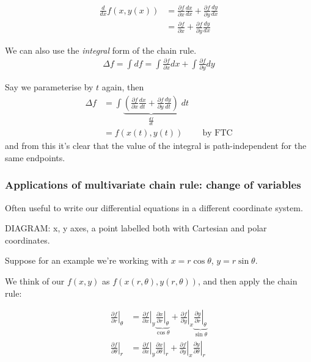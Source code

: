 \documentclass{../template/note}
\begin{document}
    \begin{align*}
        \frac{d}{dx} f(x, y(x)) &= \frac{\partial f}{\partial x}\frac{dx}{dx} + \frac{\partial f}{\partial y}\frac{dy}{dx} \\
        &= \frac{\partial f}{\partial x} + \frac{\partial f}{\partial y}\frac{dy}{dx}
    \end{align*}
    
    We can also use the \emph{integral} form of the chain rule.
    \begin{align*}
        \Delta f = \int df = \int \frac{\partial f}{\partial x} dx + \int \frac{\partial f}{\partial y} dy
    \end{align*}
    
    Say we parameterise by \(t\) again, then 
    \begin{align*}
        \Delta f &= \int \underbrace{\left(\frac{\partial f}{\partial x}\frac{dx}{dt} + \frac{\partial f}{\partial y}\frac{dy}{dt}\right)}_{\displaystyle\frac{df}{dt}} \; dt \\
        &= f(x(t), y(t)) && \text{by FTC}
    \end{align*}
    and from this it's clear that the value of the integral is path-independent for the same endpoints.

    \subsubsection{Applications of multivariate chain rule: change of variables}

    Often useful to write our differential equations in a different coordinate system.


    DIAGRAM: x, y axes, a point labelled both with Cartesian and polar coordinates.

    Suppose for an example we're working with \(x = r \cos \theta\), \(y = r \sin \theta\).

    We think of our \(f(x, y)\) as \(f(x(r, \theta), y(r, \theta))\), and then apply the chain rule:

    \begin{align*}
        \left.\frac{\partial f}{\partial r}\right|_{\theta} &= \left.\frac{\partial f}{\partial x} \right|_y \underbrace{\left.\frac{\partial x}{\partial r}\right|_{\theta}}_{\cos \theta} + \left.\frac{\partial f}{\partial y}\right|_x \underbrace{\left.\frac{\partial y}{\partial r}\right|_{\theta}}_{\sin \theta} \\
        \left.\frac{\partial f}{\partial \theta}\right|_{r} &= \left.\frac{\partial f}{\partial x} \right|_y \left.\frac{\partial x}{\partial \theta}\right|_{r} + \left.\frac{\partial f}{\partial y}\right|_x \left.\frac{\partial y}{\partial \theta}\right|_{r}
    \end{align*}
    
\end{document}
